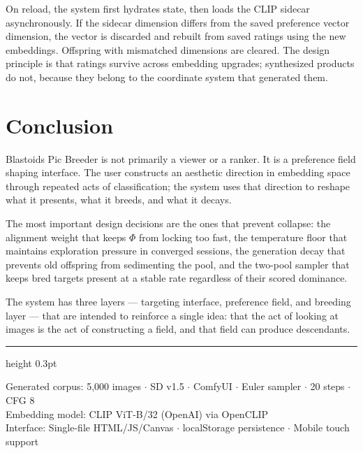 \documentclass[12pt, a4paper]{article}
\begin{document}
On reload, the system first hydrates state, then loads the CLIP sidecar asynchronously. If the sidecar dimension differs from the saved preference vector dimension, the vector is discarded and rebuilt from saved ratings using the new embeddings. Offspring with mismatched dimensions are cleared. The design principle is that ratings survive across embedding upgrades; synthesized products do not, because they belong to the coordinate system that generated them.

\section{Conclusion}

Blastoids Pic Breeder is not primarily a viewer or a ranker. It is a preference field shaping interface. The user constructs an aesthetic direction in embedding space through repeated acts of classification; the system uses that direction to reshape what it presents, what it breeds, and what it decays.

The most important design decisions are the ones that prevent collapse: the alignment weight that keeps $\Phi$ from locking too fast, the temperature floor that maintains exploration pressure in converged sessions, the generation decay that prevents old offspring from sedimenting the pool, and the two-pool sampler that keeps bred targets present at a stable rate regardless of their scored dominance.

The system has three layers --- targeting interface, preference field, and breeding layer --- that are intended to reinforce a single idea: that the act of looking at images is the act of constructing a field, and that field can produce descendants.

\vspace{2em}
\hrule height 0.3pt
\vspace{1em}

\begin{center}
{\small\color{commentgray}
Generated corpus: 5,000 images $\cdot$ SD v1.5 $\cdot$ ComfyUI $\cdot$ Euler sampler $\cdot$ 20 steps $\cdot$ CFG 8\\
Embedding model: CLIP ViT-B/32 (OpenAI) via OpenCLIP\\
Interface: Single-file HTML/JS/Canvas $\cdot$ localStorage persistence $\cdot$ Mobile touch support
}
\end{center}
\end{document}
